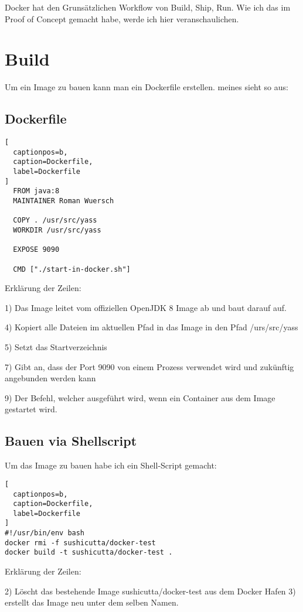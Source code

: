 Docker hat den Grunsätzlichen Workflow von Build, Ship, Run. Wie ich das im Proof of Concept
gemacht habe, werde ich hier veranschaulichen.

\section{Build}

Um ein Image zu bauen kann man ein Dockerfile erstellen. meines sieht so aus:

\subsection{Dockerfile}

\begin{lstlisting}[
  captionpos=b,
  caption=Dockerfile,
  label=Dockerfile
]
  FROM java:8
  MAINTAINER Roman Wuersch

  COPY . /usr/src/yass
  WORKDIR /usr/src/yass

  EXPOSE 9090

  CMD ["./start-in-docker.sh"]
\end{lstlisting}

Erklärung der Zeilen:

1) Das Image leitet vom offiziellen OpenJDK 8 Image ab und baut darauf auf.

4) Kopiert alle Dateien im aktuellen Pfad in das Image in den Pfad /urs/src/yass

5) Setzt das Startverzeichnis

7) Gibt an, dass der Port 9090 von einem Prozess verwendet wird und zukünftig angebunden werden kann

9) Der Befehl, welcher ausgeführt wird, wenn ein Container aus dem Image gestartet wird.

\subsection{Bauen via Shellscript}

Um das Image zu bauen habe ich ein Shell-Script gemacht:

\begin{lstlisting}[
  captionpos=b,
  caption=Dockerfile,
  label=Dockerfile
]
#!/usr/bin/env bash
docker rmi -f sushicutta/docker-test
docker build -t sushicutta/docker-test .
\end{lstlisting}

Erklärung der Zeilen:

2) Löscht das bestehende Image sushicutta/docker-test aus dem Docker Hafen
3) erstellt das Image neu unter dem selben Namen.

